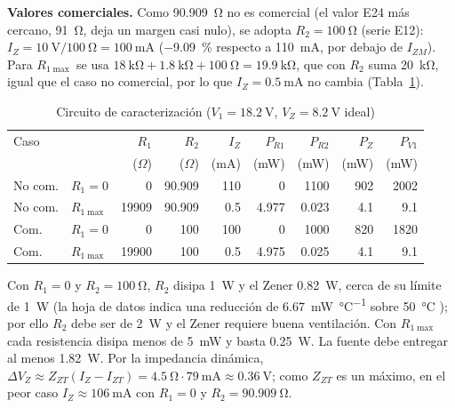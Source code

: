 \documentclass[9pt, conference]{IEEEtran}
\newcommand{\qV}[1]{\SI{#1}{\volt}}
\newcommand{\qmA}[1]{\SI{#1}{\milli\ampere}}
\newcommand{\qohm}[1]{\SI{#1}{\ohm}}
\newcommand{\qkohm}[1]{\SI{#1}{\kilo\ohm}}
\newcommand{\qmW}[1]{\SI{#1}{\milli\watt}}
\newcommand{\qW}[1]{\SI{#1}{\watt}}
\newcommand{\pct}[1]{\SI{#1}{\percent}}
\begin{document}
\textbf{Valores comerciales.} Como \qohm{90.909} no es comercial (el valor E24 más cercano, \qohm{91}, deja un margen casi nulo), se adopta $R_2=\qohm{100}$ (serie E12): $I_Z=\qV{10}/\qohm{100}=\qmA{100}$ (\pct{-9.09} respecto a \qmA{110}, por debajo de $I_{ZM}$). Para $R_{1\max}$ se usa $\qkohm{18}+\qkohm{1.8}+\qohm{100}=\qkohm{19.9}$, que con $R_2$ suma \qkohm{20}, igual que el caso no comercial, por lo que $I_Z=\qmA{0.5}$ no cambia (Tabla~\ref{tab:zener1}).

\begin{table}[htbp]
\caption{Circuito de caracterización ($V_1=\qV{18.2}$, $V_Z=\qV{8.2}$ ideal)}
\label{tab:zener1}
\centering
\scriptsize
\setlength{\tabcolsep}{3pt}
\begin{tabular}{llrrrrrrr}
\toprule
Caso & & $R_1$ & $R_2$ & $I_Z$ & $P_{R1}$ & $P_{R2}$ & $P_Z$ & $P_{V1}$ \\
 & & ($\Omega$) & ($\Omega$) & (mA) & (mW) & (mW) & (mW) & (mW) \\
\midrule
No com. & $R_1=0$ & 0 & 90.909 & 110 & 0 & 1100 & 902 & 2002 \\
No com. & $R_{1\max}$ & \num{19909} & 90.909 & 0.5 & 4.977 & 0.023 & 4.1 & 9.1 \\
Com. & $R_1=0$ & 0 & 100 & 100 & 0 & 1000 & 820 & 1820 \\
Com. & $R_{1\max}$ & \num{19900} & 100 & 0.5 & 4.975 & 0.025 & 4.1 & 9.1 \\
\bottomrule
\end{tabular}
\end{table}

Con $R_1=0$ y $R_2=\qohm{100}$, $R_2$ disipa \qW{1} y el Zener \qW{0.82}, cerca de su límite de \qW{1} (la hoja de datos indica una reducción de \SI{6.67}{\milli\watt\per\celsius} sobre \SI{50}{\celsius} \cite{fairchild}); por ello $R_2$ debe ser de \qW{2} y el Zener requiere buena ventilación. Con $R_{1\max}$ cada resistencia disipa menos de \qmW{5} y basta \qW{0.25}. La fuente debe entregar al menos \qW{1.82}. Por la impedancia dinámica, $\Delta V_Z\approx Z_{ZT}(I_Z-I_{ZT})=\qohm{4.5}\cdot\qmA{79}\approx\qV{0.36}$; como $Z_{ZT}$ es un máximo, en el peor caso $I_Z\approx\qmA{106}$ con $R_1=0$ y $R_2=\qohm{90.909}$.
\end{document}
